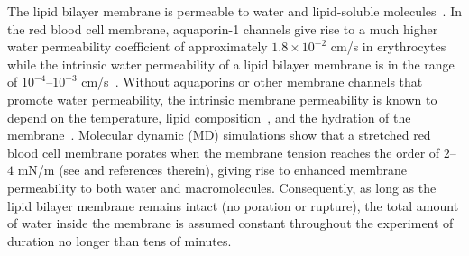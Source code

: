 \documentclass[prb,preprint,showpacs,preprintnumbers,amsmath,amssymb,longbibliography]{revtex4-1}
\begin{document}
The lipid bilayer membrane is permeable to water and lipid-soluble
molecules~\cite{Dick1964_JTB, FettiplaceHaydon1980_PhysRev,
DeamerBramhall1986_ChemPhysLipids, Grafmueller2019_ABLS}. 
%
%
In the red blood cell membrane, aquaporin-1 channels give rise to a much
higher water permeability coefficient of approximately $1.8\times 10^{-2}$ cm/s in
erythrocytes~\cite{YangMaVerkman2001_JBC} while the intrinsic water
permeability of a lipid bilayer membrane is in the range of
$10^{-4}$--$10^{-3}$ cm/s~\cite{ThompsonHuang1966_ANYAS,
FettiplaceHaydon1980_PhysRev, Grafmueller2019_ABLS, Dimova2020_GVB,
BhatiaRobinsonDimova2020_SoftMatt}. 
Without aquaporins or other membrane channels that promote water
permeability, the intrinsic membrane permeability is known to depend on the
temperature, lipid composition~\cite{OlbrichRawiczNeedhamEtAl2000_BJ},
and the hydration of the membrane~\cite{MarrinkBerendsen1994_JPhysChem}.
%
Molecular dynamic (MD) simulations show that a stretched red blood cell
membrane porates when the membrane tension reaches the order of $2$--$4$
mN/m (see \citet{RazizadehNikfarPaulLiu2020_BJ} and references therein),
giving rise to enhanced membrane permeability to both water and
macromolecules. Consequently, as long as the lipid bilayer membrane
remains intact (no poration or rupture), the total amount of water inside the membrane 
is assumed constant throughout the experiment of duration
no longer than tens of minutes.
%
\end{document}
